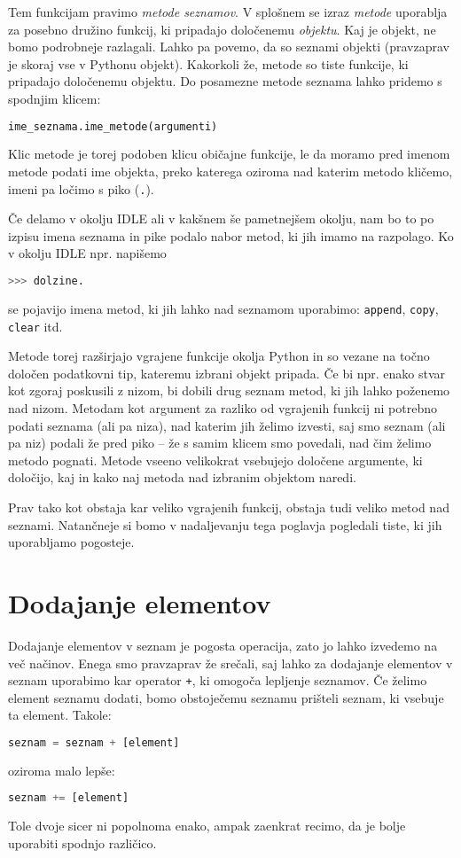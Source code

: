 Tem funkcijam pravimo \emph{metode seznamov}. V splošnem se izraz \emph{metode} uporablja za posebno družino funkcij, ki pripadajo določenemu \emph{objektu}. Kaj je objekt, ne bomo podrobneje razlagali. Lahko pa povemo, da so seznami objekti (pravzaprav je skoraj vse v Pythonu objekt). Kakorkoli že, metode so tiste funkcije, ki pripadajo določenemu objektu. Do posamezne metode seznama lahko pridemo s spodnjim klicem:
\begin{lstlisting}[language=Python]
ime_seznama.ime_metode(argumenti)
\end{lstlisting}
Klic metode je torej podoben klicu običajne funkcije, le da moramo pred imenom metode podati ime objekta, preko katerega oziroma nad katerim metodo kličemo, imeni pa ločimo s piko (\texttt{.}).

Če delamo v okolju IDLE ali v kakšnem še pametnejšem okolju, nam bo to po izpisu imena seznama in pike podalo nabor metod, ki jih imamo na razpolago. Ko v okolju IDLE npr. napišemo
\begin{lstlisting}[language=Python]
>>> dolzine.
\end{lstlisting}
se pojavijo imena metod, ki jih lahko nad seznamom uporabimo: \texttt{append}, \texttt{copy}, \texttt{clear} itd.

Metode torej razširjajo vgrajene funkcije okolja Python in so vezane na točno določen podatkovni tip, kateremu izbrani objekt pripada. Če bi npr. enako stvar kot zgoraj poskusili z nizom, bi dobili drug seznam metod, ki jih lahko poženemo nad nizom. Metodam kot argument za razliko od vgrajenih funkcij ni potrebno podati seznama (ali pa niza), nad katerim jih želimo izvesti, saj smo seznam (ali pa niz) podali že pred piko -- že s samim klicem smo povedali, nad čim želimo metodo pognati. Metode vseeno velikokrat vsebujejo določene argumente, ki določijo, kaj in kako naj metoda nad izbranim objektom naredi. 

Prav tako kot obstaja kar veliko vgrajenih funkcij, obstaja tudi veliko metod nad seznami. Natančneje si bomo v nadaljevanju tega poglavja pogledali tiste, ki jih uporabljamo pogosteje.

\section{Dodajanje elementov}

Dodajanje elementov v seznam je pogosta operacija, zato jo lahko izvedemo na več načinov. Enega smo pravzaprav že srečali, saj lahko za dodajanje elementov v seznam uporabimo kar operator \texttt{+}, ki omogoča lepljenje seznamov. Če želimo element seznamu dodati, bomo obstoječemu seznamu prišteli seznam, ki vsebuje ta element. Takole:
\begin{lstlisting}[language=Python]
seznam = seznam + [element]
\end{lstlisting}
oziroma malo lepše:
\begin{lstlisting}[language=Python]
seznam += [element]
\end{lstlisting}
Tole dvoje sicer ni popolnoma enako, ampak zaenkrat recimo, da je bolje uporabiti spodnjo različico. 

